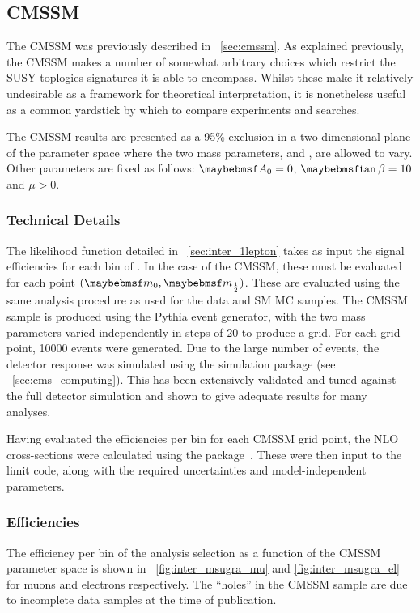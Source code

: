 \subsection{\ac{CMSSM}}
The \ac{CMSSM} was previously described in \sec~\ref{sec:cmssm}. As explained
previously, the \ac{CMSSM} makes a number of somewhat arbitrary choices which
restrict the \ac{SUSY} toplogies signatures it is able to encompass. Whilst
these make it relatively undesirable as a framework for theoretical
interpretation, it is nonetheless useful as a common yardstick by which to
compare experiments and searches.

The \ac{CMSSM} results are presented as a 95\% exclusion in a two-dimensional
plane of the parameter space where the two mass parameters, \Mzero and \Mhalf,
are allowed to vary. Other parameters are fixed as follows: $\Azero = 0$,
$\tanbeta = 10$ and $\mu > 0$.

\subsubsection{Technical Details}
The likelihood function detailed in \sec~\ref{sec:inter_1lepton} takes as
input the signal efficiencies for each bin of \STlep. In the case of the
\ac{CMSSM}, these must be evaluated for each point $(\Mzero, \Mhalf)$. These are
evaluated using the same analysis procedure as used for the data and \ac{SM}
\ac{MC} samples. The \ac{CMSSM} sample is produced using the Pythia event
generator, with the two mass parameters varied independently in steps of
\unit{20}{\GeV} to produce a grid. For each grid point, 10000 events were
generated. Due to the large number of events, the detector response was
simulated using the \fastsim simulation package (see
\sec~\ref{sec:cms_computing}). This has been extensively validated and tuned
against the full detector simulation and shown to give adequate results for many
analyses.

Having evaluated the efficiencies per \STlep bin for each \ac{CMSSM} grid point,
the \ac{NLO} cross-sections were calculated using the \prospino
package~\cite{prospino}. These were then input to the limit code, along with the
required uncertainties and model-independent parameters.

\subsubsection{Efficiencies}
The efficiency per \STlep bin of the analysis selection as a function of the
\ac{CMSSM} parameter space is shown in \figs~\ref{fig:inter_msugra_mu} and
\ref{fig:inter_msugra_el} for muons and electrons respectively. The ``holes'' in
the \ac{CMSSM} sample are due to incomplete data samples at the time of
publication.

